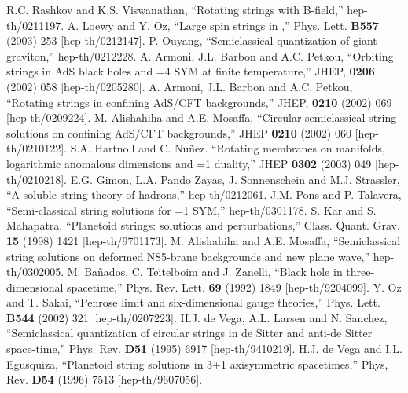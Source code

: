 \documentclass[12pt,a4paper]{article}
\begin{document}
\begin{thebibliography}{99}
 R.C. Rashkov and K.S. Viswanathan, ``Rotating strings
with B-field,'' hep-th/0211197.
 A. Loewy and Y. Oz, ``Large spin strings in \coordHE{},''
Phys. Lett. \textbf{B557} (2003) 253 [hep-th/0212147].
 P. Ouyang, ``Semiclassical quantization of giant 
graviton,'' hep-th/0212228.
 A. Armoni, J.L. Barbon and A.C. Petkou, ``Orbiting
strings in AdS black holes and \coordHE{}=4 SYM at finite 
temperature,'' JHEP, \textbf{0206} (2002) 058 [hep-th/0205280].
 A. Armoni, J.L. Barbon and A.C. Petkou, ``Rotating
strings in confining AdS/CFT backgrounds,'' JHEP, \textbf{0210} (2002) 069
[hep-th/0209224].
 M. Alishahiha and A.E. Mosaffa, ``Circular semiclassical
string solutions on confining AdS/CFT backgrounds,'' JHEP \textbf{0210}
(2002) 060 [hep-th/0210122].
 S.A. Hartnoll and C. Nu\~nez. ``Rotating membranes
on \coordHE{} manifolds, logarithmic anomalous dimensions and \coordHE{}=1
duality,'' JHEP \textbf{0302} (2003) 049 [hep-th/0210218].
 E.G. Gimon, L.A. Pando Zayas, J. Sonnenschein and M.J. 
Strassler, ``A soluble string theory of hadrons,'' hep-th/0212061.
 J.M. Pons and P. Talavera, ``Semi-classical string solutions
for \coordHE{}=1 SYM,'' hep-th/0301178.
 S. Kar and S. Mahapatra, ``Planetoid strings: solutions and
perturbations,'' Class. Quant. Grav. \textbf{15} (1998) 1421
[hep-th/9701173].
 M. Alishahiha and A.E. Mosaffa, ``Semiclassical string
solutions on deformed NS5-brane backgrounds and new plane wave,''
hep-th/0302005.
 M. Ba\~nados, C. Teitelboim and J. Zanelli,
``Black hole in three-dimensional spacetime,'' Phys. Rev. Lett.
\textbf{69} (1992) 1849 [hep-th/9204099].
 Y. Oz and T. Sakai, ``Penrose limit and six-dimensional
gauge theories,'' Phys. Lett. \textbf{B544} (2002) 321 [hep-th/0207223].
 H.J. de Vega, A.L. Larsen and N. Sanchez, ``Semiclassical
quantization of circular strings in de Sitter and anti-de Sitter 
space-time,'' Phys. Rev. \textbf{D51} (1995) 6917 [hep-th/9410219].
 H.J. de Vega and I.L. Egusquiza, ``Planetoid string solutions
in 3+1 axisymmetric spacetimes,'' Phys, Rev. \textbf{D54} (1996) 7513
[hep-th/9607056].
  
\end{thebibliography}
\end{document}
